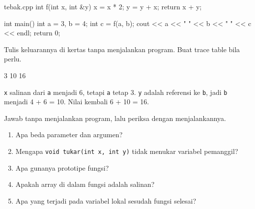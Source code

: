 \documentclass[a4paper]{article}
\begin{document}
\begin{MKode}{tebak.cpp}
int f(int x, int &y) {
    x = x * 2;
    y = y + x;
    return x + y;
}

int main() {
    int a = 3, b = 4;
    int c = f(a, b);
    cout << a << " " << b << " " << c << endl;
    return 0;
}
\end{MKode}
\begin{Tebak}[]
Tulis keluarannya di kertas tanpa menjalankan program. Buat trace table bila perlu.
\end{Tebak}
\begin{Jawaban}[]
\begin{MKeluaran}[]
3 10 16
\end{MKeluaran}
\texttt{x} salinan dari \texttt{a} menjadi 6, tetapi \texttt{a} tetap 3. \texttt{y} adalah referensi ke \texttt{b}, jadi \texttt{b} menjadi 4 + 6 = 10. Nilai kembali 6 + 10 = 16.
\end{Jawaban}
\par\vspace{4pt}\par\vspace{6pt}
Jawab tanpa menjalankan program, lalu periksa dengan menjalankannya.
\begin{enumerate}
\item Apa beda parameter dan argumen?
\item Mengapa \texttt{void tukar(int x, int y)} tidak menukar variabel pemanggil?
\item Apa gunanya prototipe fungsi?
\item Apakah array di dalam fungsi adalah salinan?
\item Apa yang terjadi pada variabel lokal sesudah fungsi selesai?
\end{enumerate}
\end{document}
